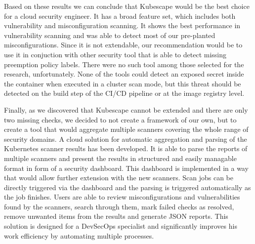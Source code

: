 Based on these results we can conclude that Kubescape would be the best choice for a cloud security engineer. It has a broad feature set, which includes both vulnerability and misconfiguration scanning. It shows the best performance in vulnerability scanning and was able to detect most of our pre-planted misconfigurations. Since it is not extendable, our recommendation would be to use it in conjuction with other security tool that is able to detect missing preemption policy labels. There were no such tool among those selected for the research, unfortunately. None of the tools could detect an exposed secret inside the container when executed in a cluster scan mode, but this threat should be detected on the build step of the CI/CD pipeline or at the image registry level.

Finally, as we discovered that Kubescape cannot be extended and there are only two missing checks, we decided to not create a framework of our own, but to create a tool that would aggregate multiple scanners covering the whole range of security domains. A cloud solution for automatic aggregation and parsing of the Kubernetes scanner results has been developed. It is able to parse the reports of multiple scanners and present the results in structured and easily managable format in form of a security dashboard. This dashboard is implemented in a way that would allow further extension with the new scanners. Scan jobs can be directly triggered via the dashboard and the parsing is triggered automatically as the job finishes. Users are able to review misconfigurations and vulnerabilities found by the scanners, search through them, mark failed checks as resolved, remove unwanted items from the results and generate JSON reports. This solution is designed for a DevSecOps specialist and significantly improves his work efficiency by automating multiple processes.